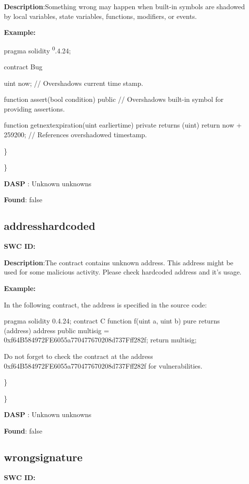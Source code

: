 \documentclass{article}
\begin{document}
\textbf{Description}:Something wrong may happen when built-in symbols are shadowed by local variables, state variables, functions, modifiers, or events.


\textbf{Example:} 

pragma solidity \textsuperscript0.4.24;

contract Bug {
    uint now; // Overshadows current time stamp.

    function assert(bool condition) public {
        // Overshadows built-in symbol for providing assertions.
    }

    function get\textunderscore next\textunderscore expiration(uint earlier\textunderscore time) private returns (uint) {
        return now + 259200; // References overshadowed timestamp.
    }
}

\} 

\} 

\textbf{DASP} : Unknown unknowns

\textbf{Found}: false

\subsection{address\textunderscore hardcoded} 
\textbf{SWC \textunderscore ID:} 

\textbf{Description}:The contract contains unknown address. This address might be used for some malicious activity. Please check hardcoded address and it's usage.


\textbf{Example:} 

In the following contract, the address is specified in the source code:

pragma solidity 0.4.24;
contract C {
  function f(uint a, uint b) pure returns (address) {
    address public multisig = 0xf64B584972FE6055a770477670208d737Fff282f;
    return multisig;
        }
}

Do not forget to check the contract at the address 0xf64B584972FE6055a770477670208d737Fff282f for vulnerabilities.

\} 

\} 

\textbf{DASP} : Unknown unknowns

\textbf{Found}: false

\subsection{wrong\textunderscore signature} 
\textbf{SWC \textunderscore ID:} 
\end{document}
